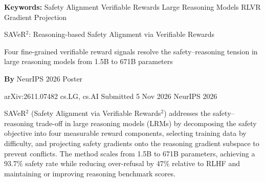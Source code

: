 \documentclass[10pt,twocolumn]{article}
\begin{document}
\setlength{\parindent}{0pt}
\setlength{\parskip}{4pt}

{\small\color{keywordgray}\textbf{Keywords:}
  Safety Alignment \textbullet{} Verifiable Rewards \textbullet{} Large Reasoning Models \textbullet{} RLVR \textbullet{} Gradient Projection}\par\vspace{4pt}

{\LARGE\bfseries\raggedright SAVeR$^2$: Reasoning-based Safety Alignment via Verifiable Rewards}\par\vspace{4pt}
{\large\itshape\raggedright Four fine-grained verifiable reward signals resolve the safety--reasoning tension in large reasoning models from 1.5B to 671B parameters}\par\vspace{6pt}
{\small\textbf{By} NeurIPS 2026 Poster}\par\vspace{2pt}
{\small\color{keywordgray}arXiv:2611.07482 \textbullet{} cs.LG, cs.AI \textbullet{} Submitted 5 Nov 2026 \textbullet{} NeurIPS 2026}
\par\vspace{2pt}\noindent{\color{rulered}\rule{\columnwidth}{0.6pt}}\vspace{6pt}

SAVeR$^2$ (Safety Alignment via Verifiable Rewards$^2$) addresses the safety--reasoning trade-off in large reasoning models (LRMs) by decomposing the safety objective into four measurable reward components, selecting training data by difficulty, and projecting safety gradients onto the reasoning gradient subspace to prevent conflicts.
The method scales from 1.5B to 671B parameters, achieving a 93.7\% safety rate while reducing over-refusal by 47\% relative to RLHF and maintaining or improving reasoning benchmark scores.
\end{document}
